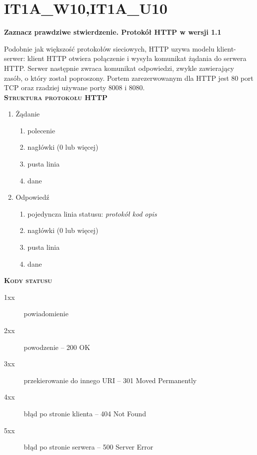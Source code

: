 \section{IT1A\_W10,IT1A\_U10}
\textbf{Zaznacz prawdziwe stwierdzenie. Protokół HTTP w  wersji 1.1}
\vspace{0.4cm}
\noindent

Podobnie jak większość protokołów sieciowych, HTTP uzywa modelu klient-serwer: klient HTTP otwiera połączenie i wysyła komunikat żądania do serwera HTTP. Serwer następnie zwraca komunikat odpowiedzi, zwykle zawierający zasób, o który został poproszony.
Portem zarezerwowanym dla HTTP jest 80 port TCP oraz rzadziej używane porty 8008 i 8080.\\

\textsc{\textbf{Struktura protokołu HTTP}}

\begin{enumerate}
\item Żądanie
	\begin{enumerate}
	\item{polecenie}
	\item{nagłówki (0 lub więcej)}
	\item pusta linia
	\item dane
	\end{enumerate}
\item Odpowiedź
	\begin{enumerate}
		\item pojedyncza linia statusu: \textit{protokół kod opis}
		\item{nagłówki (0 lub więcej)}
		\item pusta linia
		\item dane
	\end{enumerate}
\end{enumerate}


\textsc{\textbf{Kody statusu}}

\begin{description}
\item[1xx] powiadomienie
\item[2xx] powodzenie – 200 OK
\item[3xx] przekierowanie do innego URI – 301 Moved Permanently
\item[4xx] błąd po stronie klienta – 404 Not Found
\item[5xx] błąd po stronie serwera – 500 Server Error
\end{description}

